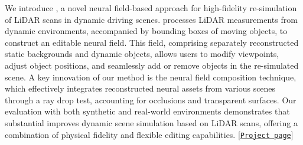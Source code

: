 We introduce \dynfl, a novel neural field-based approach for high-fidelity re-simulation of LiDAR scans in dynamic driving scenes. \dynfl processes LiDAR measurements from dynamic environments, accompanied by bounding boxes of moving objects, to construct an editable neural field. This field, comprising separately reconstructed static backgrounds and dynamic objects, allows users to modify viewpoints, adjust object positions, and seamlessly add or remove objects in the re-simulated scene.
%
A key innovation of our method is the neural field composition technique, which effectively integrates reconstructed neural assets from various scenes through a ray drop test, accounting for occlusions and transparent surfaces.
Our evaluation with both synthetic and real-world environments demonstrates that \dynfl substantial improves dynamic scene simulation based on LiDAR scans, offering a combination of physical fidelity and flexible editing capabilities. [\href{https://shengyuh.github.io/dynfl/index.html}{\texttt{Project page}}]